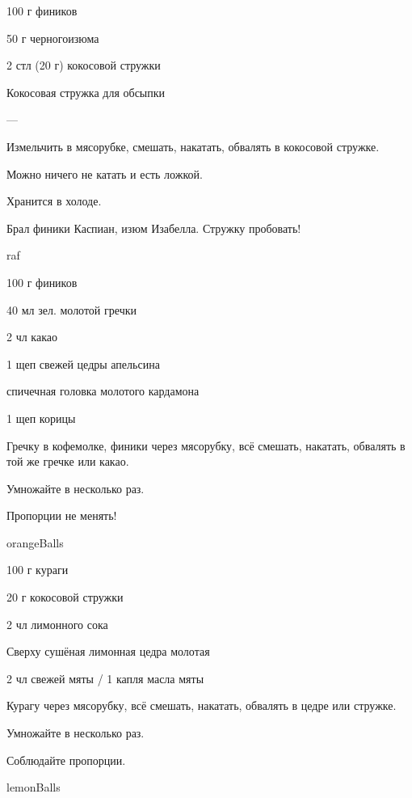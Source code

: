 {
\item 100 г фиников

\item 50 г черногоизюма
\item 2 стл (20 г) кокосовой стружки 
\item Кокосовая стружка для обсыпки
}{
\item ---
}{
Измельчить в мясорубке, смешать, накатать, обвалять в кокосовой стружке.  
}{
\begin{advice}
\item Можно ничего не катать и есть ложкой.
    \item Хранится в холоде.
        \item Брал финики Каспиан, изюм Изабелла. Стружку пробовать!

\end{advice}
}{raf}





{
\item 100 г фиников
\item 40 мл зел. молотой гречки 
\item 2 чл какао
}{
\item 1 щеп свежей цедры апельсина
\item спичечная головка молотого кардамона
\item 1 щеп корицы
}{
Гречку в кофемолке, финики через мясорубку, всё смешать, накатать, обвалять в той же гречке или какао.
 
}{
\begin{advice}
\item Умножайте в несколько раз.
\item Пропорции не менять!
\end{advice}}{orangeBalls}




{
\item 100 г кураги
\item 20 г кокосовой стружки
\item 2 чл лимонного сока
\item Сверху сушёная лимонная цедра молотая
}{
\item 2 чл свежей мяты / 1 капля масла мяты
}{
Курагу через мясорубку, всё смешать, накатать, обвалять в цедре или стружке. 
}{
\begin{advice}
\item Умножайте в несколько раз.
\item Соблюдайте пропорции.
\end{advice}}{lemonBalls}







